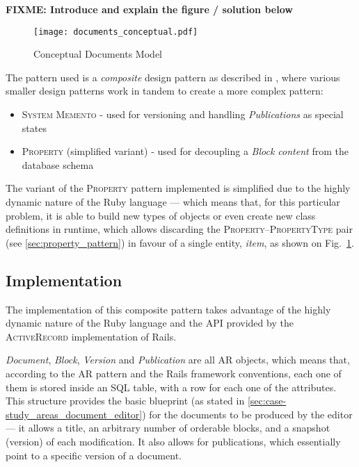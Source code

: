 \textbf{FIXME: Introduce and explain the figure / solution below}

\begin{figure}[H]
  \centering
  \texttt{[image: documents\_conceptual.pdf]}
  \caption{Conceptual Documents Model}
  \label{fig:documents_conceptual}
\end{figure}

The pattern used is a \emph{composite} design pattern as described in \cite{riehle_composite_patterns}, where various smaller design patterns work in tandem to create a more complex pattern:

\begin{itemize}
  \item \textsc{System Memento} - used for versioning and handling \emph{Publications} as special states
  \item \textsc{Property} (simplified variant) - used for decoupling a \emph{Block content} from the database schema
\end{itemize}

The variant of the \textsc{Property} pattern implemented is simplified due to the highly dynamic nature of the Ruby language --- which means that, for this particular problem, it is able to build new types of objects or even create new class definitions in runtime, which allows discarding the \textsc{Property}--\textsc{PropertyType} pair (see \ref{sec:property_pattern}) in favour of a single entity, \emph{item}, as shown on Fig.~\ref{fig:documents_conceptual}.

\subsection{Implementation}\label{sec:fa_documents_implementation}

The implementation of this composite pattern takes advantage of the highly dynamic nature of the Ruby language and the API provided by the \textsc{ActiveRecord} implementation of Rails.

\emph{Document}, \emph{Block}, \emph{Version} and \emph{Publication} are all AR objects, which means that, according to the AR pattern and the Rails framework conventions, each one of them is stored inside an SQL table, with a row for each one of the attributes. This structure provides the basic blueprint (as stated in \ref{sec:case-study_areas_document_editor}) for the documents to be produced by the editor --- it allows a title, an arbitrary number of orderable blocks, and a snapshot (version) of each modification. It also allows for publications, which essentially point to a specific version of a document.

